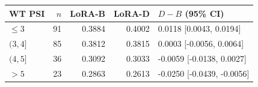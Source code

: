 
{\small\setlength{\tabcolsep}{4pt}
\begin{tabularx}{\textwidth}{Xrrrl}
\toprule
WT PSI & $n$ & LoRA-B & LoRA-D & $D-B$ (95\% CI) \\
\midrule
$\le3$ & 91 & 0.3884 & 0.4002 & 0.0118 [0.0043, 0.0194] \\
$(3,4]$ & 85 & 0.3812 & 0.3815 & 0.0003 [-0.0056, 0.0064] \\
$(4,5]$ & 36 & 0.3092 & 0.3033 & -0.0059 [-0.0138, 0.0027] \\
$>5$ & 23 & 0.2863 & 0.2613 & -0.0250 [-0.0439, -0.0056] \\
\bottomrule
\end{tabularx}}
